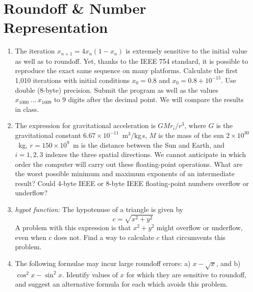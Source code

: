 \documentclass{article}
\begin{document}
\newpage
\section{Roundoff \& Number Representation}

\begin{enumerate}
\item \label{prbl:logistic1000}
The iteration $x_{n+1} = 4x_n (1-x_n)$ is extremely sensitive to the initial value as well as to roundoff. Yet, thanks to the IEEE 754 standard, it is possible to reproduce the exact same sequence on many platforms.
Calculate the first 1,010 iterations with initial conditions $x_0=0.8$ and $x_0 = 0.8+10^{-15}$. Use double (8-byte) precision.  
Submit the program as well as the values $x_{1000}~\dots~x_{1009}$ to 9 digits after the decimal point.
We will compare the results in class.


\item \label{prbl:Goverflow}
The expression for gravitational acceleration is $G M r_i /r^3$, where
$G$ is the gravitational constant $6.67\times 10^{-11}$~m$^3$/kg\,s,
$M$ is the mass of the sun $2\times 10^{30}$~kg, $r=150\times 10^9$~m is the distance between the Sun and Earth, and $i=1, 2, 3$ indexes the three spatial directions.
We cannot anticipate in which order the computer will carry out these floating-point operations. What are the worst possible minimum and maximum exponents of an intermediate result?  Could 4-byte IEEE or 8-byte IEEE floating-point numbers overflow or underflow?


\item {\it hypot function:} The hypotenuse of a triangle is given by
  \[
  c = \sqrt{x^2+y^2}
  \]
  A problem with this expression is that $x^2+y^2$ might overflow or underflow, even when $c$ does not. Find a way to calculate $c$ that circumvents this problem.


\item 
  The following formulae may incur large roundoff errors:
a) $x-\sqrt{x}$, and 
b) $\cos^2 x - \sin^2 x$.  
Identify values of $x$ for which they are sensitive to roundoff, and
suggest an alternative formula for each which avoids this problem.

  
\end{enumerate}
\end{document}

